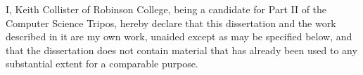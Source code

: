 \documentclass[dissertation.tex, 12pt]{subfiles}
\begin{document}
I, Keith Collister of Robinson College, being a candidate for Part II of the Computer Science Tripos, hereby declare that this dissertation and the work described in it are my own work, unaided except as may be specified below, and that the dissertation does not contain material that has already been used to any substantial extent for a comparable purpose.

\bigskip
{}

\medskip
{}
\end{document}
